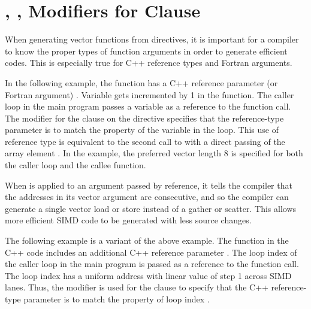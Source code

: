\section{, ,  Modifiers for  Clause}
\label{sec:linear_modifier}

When generating vector functions from  directives, 
it is important for a compiler to know the proper types of function arguments in
order to generate efficient codes.
This is especially true for C++ reference types and Fortran arguments.

In the following example, the function  has a C++ reference
parameter (or Fortran argument) .  Variable  gets incremented by 1 in the function.
The caller loop  in the main program passes 
a variable  as a reference to the function  call.   
The  modifier for the  clause on the 
 directive specifies that the 
reference-type parameter  is to match the property of the variable 
 in the loop.  
This use of reference type is equivalent to the second call to 
 with a direct passing of the array element .  
In the example, the preferred vector 
length 8 is specified for both the caller loop and the callee function.

When  is applied to an argument passed by reference, 
it tells the compiler that the addresses in its vector argument are consecutive,
and so the compiler can generate a single vector load or store instead of 
a gather or scatter. This allows more efficient SIMD code to be generated with 
less source changes.


 
The following example is a variant of the above example. The function  
in the C++ code includes an additional C++ reference parameter . 
The loop index  of the caller loop  in the main program 
is passed as a reference to the function  call.   
The loop index  has a uniform address with
linear value of step 1 across SIMD lanes. 
Thus, the  modifier is used for the  clause 
to specify that the C++ reference-type parameter  is to match 
the property of loop index .

